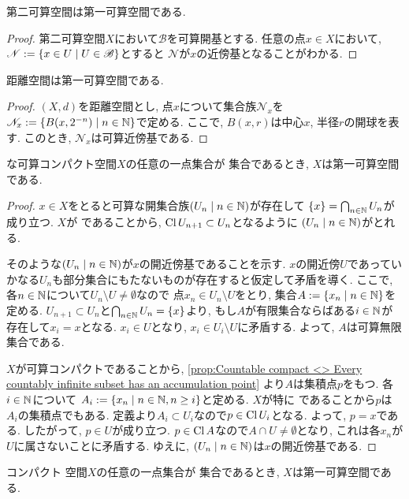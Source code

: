 \documentclass[uplatex, dvipdfmx, a4paper, 12pt, class=jsbook, crop=false]{standalone}
\begin{document}
\begin{proposition}
	第二可算空間は第一可算空間である.
\end{proposition}

\begin{proof}
	第二可算空間$ X $において$ \mathscr{B} $を可算開基とする.
	任意の点$ x \in X $において, $ \mathscr{N} \defeq \setcomp{x \in U}{U \in \mathscr{B}} $とすると
	$ \mathscr{N} $が$ x $の近傍基となることがわかる.
\end{proof}

\begin{proposition}
	距離空間は第一可算空間である.
\end{proposition}

\begin{proof}
	$ (X, d) $を距離空間とし, 点$ x $について集合族$ \mathscr{N}_x $を
	$ \mathscr{N}_x \defeq \setcomp{B(x,2^{-n})}{n \in \N} $で定める.
	ここで, $ B(x,r) $は中心$ x $, 半径$ r $の開球を表す.
	このとき, $ \mathscr{N}_x $は可算近傍基である.
\end{proof}

\begin{proposition}
	 な可算コンパクト空間$ X $の任意の一点集合が \Gdelta 集合であるとき,
	$ X $は第一可算空間である.
\end{proposition}

\begin{proof}
	$ x \in X $をとると可算な開集合族$ \setfamily{U_n}{n \in \N} $が存在して
	$ \lrbrace{x} = \bigcap_{n \in \N} U_n $が成り立つ.
	$ X $が  であることから, $ \mathop{\mathrm{Cl}}\nolimits U_{n+1} \subset U_n $となるように
	$ \setfamily{U_n}{n \in \N} $がとれる.

	そのような$ \setfamily{U_n}{n \in \N} $が$ x $の開近傍基であることを示す.
	$ x $の開近傍$ U $であっていかなる$ U_n $も部分集合にもたないものが存在すると仮定して矛盾を導く.
	ここで, 各$ n \in \mathbb{N} $について$ U_n \setminus U \neq \emptyset $なので
	点$ x_n \in U_n \setminus U $をとり, 集合$ A \defeq \setcomp{x_n}{n \in \N} $を定める.
	$ U_{n+1} \subset U_n $と$ \bigcap_{n \in \N} U_n = \lrbrace{x} $より,
	もし$ A $が有限集合ならばある$ i \in \mathbb{N} $が存在して$ x_i = x $となる.
	$ x_i \in U $となり, $ x_i \in U_i \setminus U $に矛盾する.
	よって, $ A $は可算無限集合である.

	$ X $が可算コンパクトであることから, \cref{prop:Countable compact <> Every countably infinite subset has an accumulation point}
	より$ A $は集積点$ p $をもつ. 各$ i \in \mathbb{N} $について
	$ A_i \defeq \setcomp{x_n}{n \in \N, n \geq i} $と定める.
	$ X $が特に  であることから$ p $は$ A_i $の集積点でもある.
	定義より$ A_i \subset U_i $なので$ p \in \mathop{\mathrm{Cl}}\nolimits U_i $となる.
	よって, $ p = x $である.
	したがって, $ p \in U $が成り立つ.
	$ p \in \mathop{\mathrm{Cl}}\nolimits A $なので$ A \cap U \neq \emptyset $となり,
	これは各$ x_n $が$ U $に属さないことに矛盾する.
	ゆえに, $ \setfamily{U_n}{n \in \N} $は$ x $の開近傍基である.
\end{proof}

\begin{corollary}
	コンパクト \Hausdorff 空間$ X $の任意の一点集合が \Gdelta 集合であるとき,
	$ X $は第一可算空間である.
\end{corollary}
\end{document}
